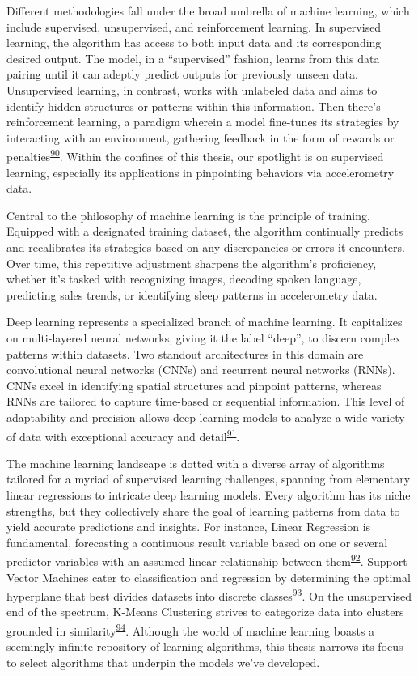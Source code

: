 \documentclass[
  10pt,
]{scrbook}
\begin{document}
Different methodologies fall under the broad umbrella of machine
learning, which include supervised, unsupervised, and reinforcement
learning. In supervised learning, the algorithm has access to both input
data and its corresponding desired output. The model, in a
``supervised'' fashion, learns from this data pairing until it can
adeptly predict outputs for previously unseen data. Unsupervised
learning, in contrast, works with unlabeled data and aims to identify
hidden structures or patterns within this information. Then there's
reinforcement learning, a paradigm wherein a model fine-tunes its
strategies by interacting with an environment, gathering feedback in the
form of rewards or
penalties\textsuperscript{\protect\hyperlink{ref-sutton_1998}{90}}.
Within the confines of this thesis, our spotlight is on supervised
learning, especially its applications in pinpointing behaviors via
accelerometry data.

Central to the philosophy of machine learning is the principle of
training. Equipped with a designated training dataset, the algorithm
continually predicts and recalibrates its strategies based on any
discrepancies or errors it encounters. Over time, this repetitive
adjustment sharpens the algorithm's proficiency, whether it's tasked
with recognizing images, decoding spoken language, predicting sales
trends, or identifying sleep patterns in accelerometry data.

Deep learning represents a specialized branch of machine learning. It
capitalizes on multi-layered neural networks, giving it the label
``deep'', to discern complex patterns within datasets. Two standout
architectures in this domain are convolutional neural networks (CNNs)
and recurrent neural networks (RNNs). CNNs excel in identifying spatial
structures and pinpoint patterns, whereas RNNs are tailored to capture
time-based or sequential information. This level of adaptability and
precision allows deep learning models to analyze a wide variety of data
with exceptional accuracy and
detail\textsuperscript{\protect\hyperlink{ref-Goodfellow-et-al-2016}{91}}.

The machine learning landscape is dotted with a diverse array of
algorithms tailored for a myriad of supervised learning challenges,
spanning from elementary linear regressions to intricate deep learning
models. Every algorithm has its niche strengths, but they collectively
share the goal of learning patterns from data to yield accurate
predictions and insights. For instance, Linear Regression is
fundamental, forecasting a continuous result variable based on one or
several predictor variables with an assumed linear relationship between
them\textsuperscript{\protect\hyperlink{ref-kutner_2005}{92}}. Support
Vector Machines cater to classification and regression by determining
the optimal hyperplane that best divides datasets into discrete
classes\textsuperscript{\protect\hyperlink{ref-cortes_1995}{93}}. On the
unsupervised end of the spectrum, K-Means Clustering strives to
categorize data into clusters grounded in
similarity\textsuperscript{\protect\hyperlink{ref-macqueen_1967}{94}}.
Although the world of machine learning boasts a seemingly infinite
repository of learning algorithms, this thesis narrows its focus to
select algorithms that underpin the models we've developed.
\end{document}
